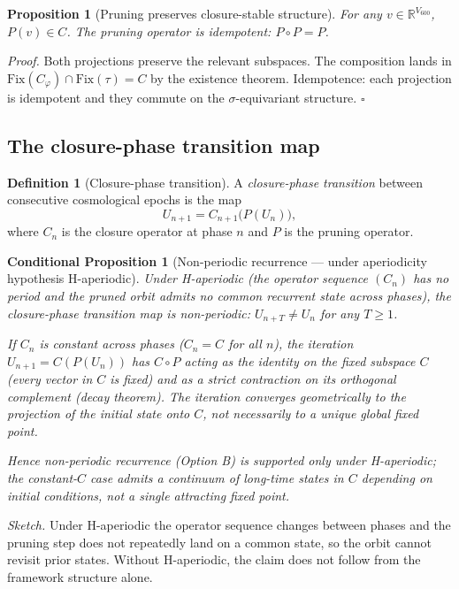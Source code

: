 \documentclass[11pt]{article}
\theoremstyle{plain}
\newtheorem{conditional}[theorem]{Conditional Proposition}
\newtheorem{proposition}[theorem]{Proposition}
\theoremstyle{definition}
\newtheorem{definition}[theorem]{Definition}
\theoremstyle{remark}
\newcommand{\Fix}{\mathrm{Fix}}
\newcommand{\Cph}{C_\varphi}
\begin{document}
\begin{proposition}[Pruning preserves closure-stable structure]\label{prop:pruning-preserves}
For any $v \in \mathbb{R}^{V_{600}}$, $P(v) \in C$. The pruning operator is idempotent: $P \circ P = P$.
\end{proposition}

\noindent\emph{Proof.} Both projections preserve the relevant subspaces. The composition lands in $\Fix(\Cph) \cap \Fix(\tau) = C$ by the existence theorem. Idempotence: each projection is idempotent and they commute on the $\sigma$-equivariant structure. \hfill$\square$

\subsection{The closure-phase transition map}

\begin{definition}[Closure-phase transition]\label{def:phase-transition}
A \emph{closure-phase transition} between consecutive cosmological epochs is the map
\[
  U_{n+1} = C_{n+1}\big( P(U_n) \big),
\]
where $C_n$ is the closure operator at phase $n$ and $P$ is the pruning operator.
\end{definition}

\begin{conditional}[Non-periodic recurrence --- under aperiodicity hypothesis H-aperiodic]\label{thm:non-periodic}
Under H-aperiodic (the operator sequence $(C_n)$ has no period \emph{and} the pruned orbit admits no common recurrent state across phases), the closure-phase transition map is non-periodic: $U_{n+T} \neq U_n$ for any $T \geq 1$.

If $C_n$ is constant across phases ($C_n = C$ for all $n$), the iteration $U_{n+1} = C(P(U_n))$ has $C \circ P$ acting as the identity on the fixed subspace $C$ (every vector in $C$ is fixed) and as a strict contraction on its orthogonal complement (decay theorem). The iteration converges geometrically to the projection of the initial state onto $C$, not necessarily to a unique global fixed point.

Hence non-periodic recurrence (Option B) is supported only under H-aperiodic; the constant-$C$ case admits a continuum of long-time states in $C$ depending on initial conditions, not a single attracting fixed point.
\end{conditional}

\noindent\emph{Sketch.} Under H-aperiodic the operator sequence changes between phases and the pruning step does not repeatedly land on a common state, so the orbit cannot revisit prior states. Without H-aperiodic, the claim does not follow from the framework structure alone.
\end{document}
